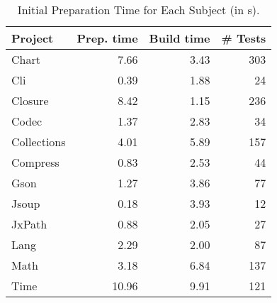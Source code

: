 \begin{table}[!t]
  \caption{Initial Preparation Time for Each Subject (in s).}
  \centering
  \begin{tabular}{lrrr}
    \hline
    \textbf{Project} & Prep. time & Build time & \# Tests \\
    \hline
    \hline
    Chart       & 7.66 & 3.43 & 303 \\
    Cli         & 0.39 & 1.88 & 24 \\
    Closure     & 8.42 & 1.15 & 236 \\
    Codec       & 1.37 & 2.83 & 34 \\
    Collections & 4.01 & 5.89 & 157 \\
    Compress    & 0.83 & 2.53 & 44 \\
    Gson        & 1.27 & 3.86 & 77 \\
    Jsoup       & 0.18 & 3.93 & 12 \\
    JxPath      & 0.88 & 2.05 & 27 \\ 
    Lang        & 2.29 & 2.00 & 87 \\
    Math        & 3.18 & 6.84 & 137 \\
    Time        & 10.96 & 9.91 & 121 \\ 
    
    \hline
  \end{tabular}
  \label{tab:preparation_time}
\end{table}